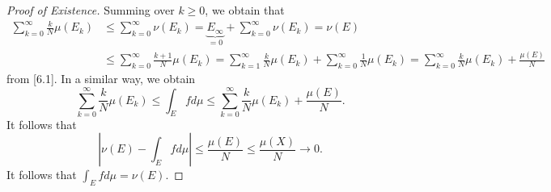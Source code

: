 \documentclass[pmath451]{subfiles}
\begin{document}
\begin{proof}[Proof of Existence]
        Summing over $k\geq 0$, we obtain that
        \begin{equation*}
            \begin{aligned}
                \sum^{\infty}_{k=0} \frac{k}{N}\mu\left( E_k \right)& \leq \sum^{\infty}_{k=0} \nu\left( E_k \right) = \underbrace{E_{\infty}}_{=0} + \sum^{\infty}_{k=0}\nu\left( E_k \right) = \nu\left( E \right)  \\
                                                                    & \leq \sum^{\infty}_{k=0} \frac{k+1}{N}\mu\left( E_k \right) = \sum^{\infty}_{k=1} \frac{k}{N}\mu\left( E_k \right) + \sum^{\infty}_{k=0} \frac{1}{N}\mu\left( E_k \right) = \sum^{\infty}_{k=0} \frac{k}{N}\mu\left( E_k \right) + \frac{\mu\left( E \right)}{N}
            \end{aligned} 
        \end{equation*}
        from [6.1]. In a similar way, we obtain
        \begin{equation*}
            \sum^{\infty}_{k=0} \frac{k}{N}\mu\left( E_k \right)\leq\int_Efd\mu \leq \sum^{\infty}_{k=0} \frac{k}{N}\mu\left( E_k \right) + \frac{\mu\left( E \right)}{N}.
        \end{equation*}
        It follows that
        \begin{equation*}
            \left| \nu\left( E \right)-\int_Efd\mu \right| \leq \frac{\mu\left( E \right)}{N} \leq \frac{\mu\left( X \right)}{N} \to 0.
        \end{equation*}
        It follows that $\int_Efd\mu = \nu\left( E \right)$.
    \end{proof}
    
\end{document}

